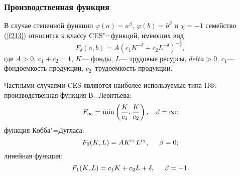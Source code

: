 \documentclass[10pt, pdf, hyperref={unicode}]{beamer}
\begin{document}
    \begin{frame}
        \frametitle{Производственная функция}
        \begin{center}
            \begin{minipage}[h]{0.97\linewidth}
                В случае степенной функции $\varphi(a)=a^\beta$, $\varphi(b)=b^\beta$ и $\chi=-1$ семейство (\ref{f213}) относится к классу CES"=функций, имеющих вид
                \begin{equation}\label{f214}
                F_\delta(a,b)=A(c_1K^{-\delta}+c_2L^{-\delta})^{-\frac1\delta},
                \end{equation}
                где $A>0$, $c_1+c_2=1$, $K$--- фонды, $L$--- трудовые ресурсы, $delta>0$, $c_1$--- фондоемкость продукции, $c_2$--трудоемкость продукции.

                Частными случаями CES являются наиболее используемые типа ПФ: производственная функция В.~Леонтьева:
                \begin{equation}\label{f215}
                F_\infty=\min\left(\frac K{c_1},\frac K{c_2}\right),\hspace{3mm}\beta=\infty;
                \end{equation}
                функция Кобба"=Дугласа:
                \begin{equation}\label{f216}
                F_0(K,L)=AK^{c_1}L^{c_2},\hspace{5mm}\beta=0;
                \end{equation}
                линейная функция:
                \begin{equation}\label{f217}
                F_1(K,L)=c_1K+c_2L+\delta,\hspace{5mm}\beta=-1.
                \end{equation}
            \end{minipage}
        \end{center}
    \end{frame}
\end{document}
